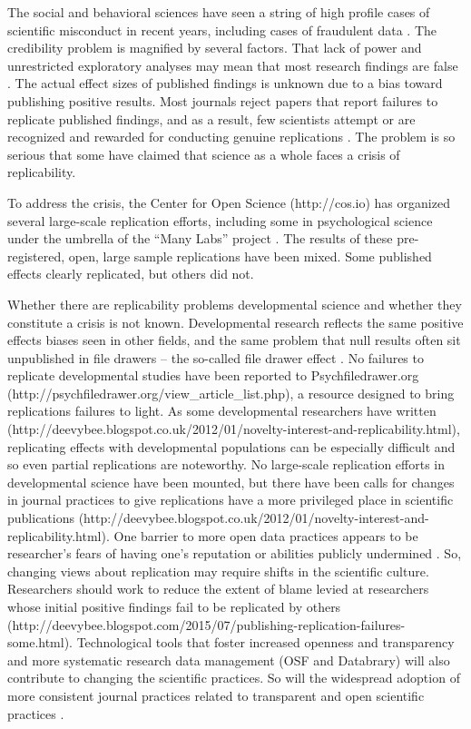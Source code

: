 \documentclass[letterpaper,man,apacite]{apa6}
\begin{document}
The social and behavioral sciences have seen a string of high profile cases of scientific misconduct in recent years, including cases of fraudulent data \cite{}.
The credibility problem is magnified by several factors.
That lack of power and unrestricted exploratory analyses may mean that most research findings are false \cite{Ioanides}.
The actual effect sizes of published findings is unknown due to a bias toward publishing positive results.
Most journals reject papers that report failures to replicate published findings, and as a result, few scientists attempt or are recognized and rewarded for conducting genuine replications \cite{Nosek-Spies}.
The problem is so serious that some have claimed that science as a whole faces a crisis of replicability.

To address the crisis, the Center for Open Science (http://cos.io) has organized several large-scale replication efforts, including some in psychological science under the umbrella of the ``Many Labs'' project \cite{klein, https://osf.io/ct89g/; https://osf.io/8cd4r/}.
The results of these pre-registered, open, large sample replications have been mixed.
Some published effects clearly replicated, but others did not.

Whether there are replicability problems developmental science and whether they constitute a crisis is not known.
Developmental research reflects the same positive effects biases seen in other fields, and the same problem that null results often sit unpublished in file drawers -- the so-called file drawer effect \cite{rosenthal_file_1979}.
No failures to replicate developmental studies have been reported to Psychfiledrawer.org (http://psychfiledrawer.org/view_article_list.php), a resource designed to bring replications failures to light.
As some developmental researchers have written (http://deevybee.blogspot.co.uk/2012/01/novelty-interest-and-replicability.html), replicating effects with developmental populations can be especially difficult and so even partial replications are noteworthy.
No large-scale replication efforts in developmental science have been mounted, but there have been calls for changes in journal practices to give replications have a more privileged place in scientific publications (http://deevybee.blogspot.co.uk/2012/01/novelty-interest-and-replicability.html).
One barrier to more open data practices appears to be researcher's fears of having one's reputation or abilities publicly undermined \cite{ascoli_ups_2006}.
So, changing views about replication may require shifts in the scientific culture.
Researchers should work to reduce the extent of blame levied at researchers whose initial positive findings fail to be replicated by others (http://deevybee.blogspot.com/2015/07/publishing-replication-failures-some.html).
Technological tools that foster increased openness and transparency and more systematic research data management (OSF and Databrary) will also contribute to changing the scientific practices.
So will the widespread adoption of more consistent journal practices related to transparent and open scientific practices \cite{nosek_promoting_2015}.
\end{document}
